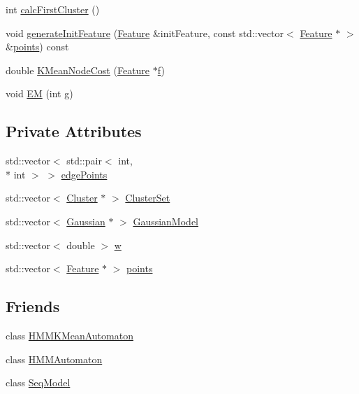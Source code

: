 \begin{DoxyCompactItemize}
\item 
int \hyperlink{class_k_mean_state_aaf0d4140fb30bb1a4a9b7140ab0b88a5}{calc\+First\+Cluster} ()
\item 
void \hyperlink{class_k_mean_state_affdc3e0cda94812b5ad822419b99242b}{generate\+Init\+Feature} (\hyperlink{class_feature}{Feature} \&init\+Feature, const std\+::vector$<$ \hyperlink{class_feature}{Feature} $\ast$ $>$ \&\hyperlink{class_k_mean_state_a19246d646907634855260eb8e14d3def}{points}) const 
\item 
double \hyperlink{class_k_mean_state_a3929ad01b84ae6f5e56f3d8b513d02cb}{K\+Mean\+Node\+Cost} (\hyperlink{class_feature}{Feature} $\ast$\hyperlink{mel2hz_8m_a09113e60f6e326656763bae1603c0eb5}{f})
\item 
void \hyperlink{class_k_mean_state_af990dd8b5857c29cb921e5b9248b44bf}{E\+M} (int g)
\end{DoxyCompactItemize}
\subsection*{Private Attributes}
\begin{DoxyCompactItemize}
\item 
std\+::vector$<$ std\+::pair$<$ int, \\*
int $>$ $>$ \hyperlink{class_k_mean_state_a4cfe086303bf1f39b038e48126dd007d}{edge\+Points}
\item 
std\+::vector$<$ \hyperlink{struct_cluster}{Cluster} $\ast$ $>$ \hyperlink{class_k_mean_state_af3d3973abdeb6f4659b46ec271be52d7}{Cluster\+Set}
\item 
std\+::vector$<$ \hyperlink{class_gaussian}{Gaussian} $\ast$ $>$ \hyperlink{class_k_mean_state_ac74dea5743d248a6049fb8ef126054a9}{Gaussian\+Model}
\item 
std\+::vector$<$ double $>$ \hyperlink{class_k_mean_state_a95902b6cdda265f947056de535ba18b0}{w}
\item 
std\+::vector$<$ \hyperlink{class_feature}{Feature} $\ast$ $>$ \hyperlink{class_k_mean_state_a19246d646907634855260eb8e14d3def}{points}
\end{DoxyCompactItemize}
\subsection*{Friends}
\begin{DoxyCompactItemize}
\item 
class \hyperlink{class_k_mean_state_ab26b380e0dac284d048154f52162b931}{H\+M\+M\+K\+Mean\+Automaton}
\item 
class \hyperlink{class_k_mean_state_a3f73063e67c75773ba856636249277b6}{H\+M\+M\+Automaton}
\item 
class \hyperlink{class_k_mean_state_a1b622e128d992231899ba78ca9c72507}{Seq\+Model}
\end{DoxyCompactItemize}
